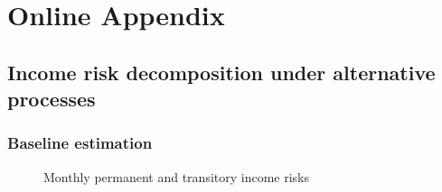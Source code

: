 \pagebreak 

\appendix
\setcounter{figure}{0} \renewcommand{\thefigure}{A.\arabic{figure}}
\setcounter{table}{0} \renewcommand{\thetable}{A.\arabic{table}}
\section{Online Appendix}
\label{sec:appendix}

\subsection{Income risk decomposition under alternative processes}

\subsubsection{Baseline estimation}

 \begin{figure}[!ht]
    	\caption{Monthly permanent and transitory income risks}
    	\label{fig:decomposed_monthly}
    	\begin{center}
    	\end{center}
    \end{figure}
    
\pagebreak


